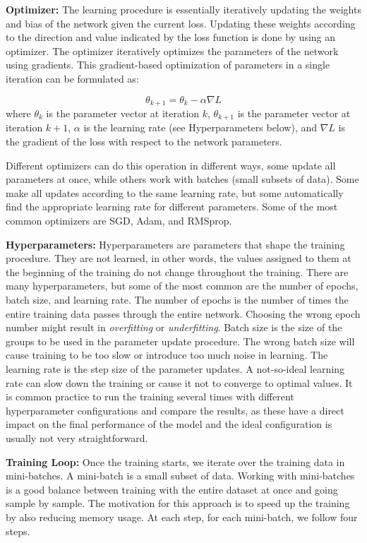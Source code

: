 \textbf{Optimizer:} The learning procedure is essentially iteratively updating the weights and bias of the network given the current loss. Updating these weights according to the direction and value indicated by the loss function is done by using an optimizer. The optimizer iteratively optimizes the parameters of the network using gradients. This gradient-based optimization of parameters in a single iteration can be formulated as:

\[
\theta_{k+1} = \theta_k - \alpha \nabla L
\]
\noindent
where \(\theta_k\) is the parameter vector at iteration $k$, \(\theta_{k+1}\) is the parameter vector at iteration $k+1$, \(\alpha\) is the learning rate (see Hyperparameters below), and \(\nabla L\) is the gradient of the loss with respect to the network parameters.

Different optimizers can do this operation in different ways, some update all parameters at once, while others work with batches (small subsets of data). Some make all updates according to the same learning rate, but some automatically find the appropriate learning rate for different parameters. Some of the most common optimizers are \ac{SGD}, Adam, and RMSprop.

\textbf{Hyperparameters:} Hyperparameters are parameters that shape the training procedure. They are not learned, in other words, the values assigned to them at the beginning of the training do not change throughout the training. There are many hyperparameters, but some of the most common are the number of epochs, batch size, and learning rate. The number of epochs is the number of times the entire training data passes through the entire network. Choosing the wrong epoch number might result in \textit{overfitting} or \textit{underfitting}. Batch size is the size of the groups to be used in the parameter update procedure. The wrong batch size will cause training to be too slow or introduce too much noise in learning. The learning rate is the step size of the parameter updates. A not-so-ideal learning rate can slow down the training or cause it not to converge to optimal values. It is common practice to run the training several times with different hyperparameter configurations and compare the results, as these have a direct impact on the final performance of the model and the ideal configuration is usually not very straightforward.

\textbf{Training Loop:} Once the training starts, we iterate over the training data in mini-batches. A mini-batch is a small subset of data. Working with mini-batches is a good balance between training with the entire dataset at once and going sample by sample. The motivation for this approach is to speed up the training by also reducing memory usage. 
At each step, for each mini-batch, we follow four steps.

